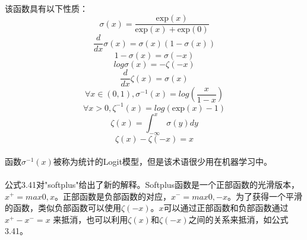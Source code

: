 \documentclass{article}
\begin{document}
   \paragraph{}
   该函数具有以下性质：
   \begin{equation}
    \sigma(x)=\frac{\mathrm{exp}(x)}{\mathrm{exp}(x)+\mathrm{exp}(0)}   \tag{3.33}
   \end{equation}
   \begin{equation}
    \frac{d}{dx}\sigma(x)=\sigma(x)(1-\sigma(x))   \tag{3.34}
   \end{equation}
   \begin{equation}
    1-\sigma(x)=\sigma(-x)   \tag{3.35}
   \end{equation}
   \begin{equation}
    log\sigma(x)=-\zeta(-x)   \tag{3.36}
   \end{equation}
    \begin{equation}
    \frac{d}{dx}\zeta(x)=\sigma(x)  \tag{3.37}
   \end{equation}
   \begin{equation}
   \forall x\in(0,1),\sigma^{-1}(x)=log(\frac{x}{1-x})  \tag{3.38}
   \end{equation}
   \begin{equation}
   \forall x>0,\zeta^{-1}(x)=log(\mathrm{exp}(x)-1)  \tag{3.39}
   \end{equation}
   \begin{equation}
   \zeta(x)=\int_{-\infty}^{x}\sigma(y)dy  \tag{3.40}
   \end{equation}
   \begin{equation}
   \zeta(x)-\zeta(-x)=x \tag{3.41}
   \end{equation}
   \paragraph{}
   函数$\sigma^{-1}(x)$被称为统计的Logit模型，但是该术语很少用在机器学习中。
   \paragraph{}
   公式3.41对"softplus"给出了新的解释。Softplus函数是一个正部函数的光滑版本，$x^{+} =max{0, x}$。正部函数是负部函数的对应，$x^{-} = max{0,-x}$。为了获得一个平滑的函数，类似负部函数可以使用$\zeta(-x)$。$x$可以通过正部函数和负部函数通过$x^{+}- x^{-} = x$ 来抵消，也可以利用$\zeta(x)$和$\zeta(-x)$之间的关系来抵消，如公式3.41。

\end{document}
